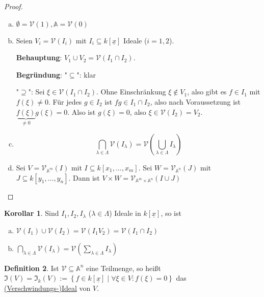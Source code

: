 \documentclass[
twoside=semi,
fontsize=12,
DIV=12, 
cleardoublepage=current,
leqno,
headings=optiontoheadandtoc, 
toc=idx
]{scrbook}
\newcommand{\A}{\mathbb{A}}
\newcommand{\V}{\mathcal{V}}
\newcommand{\x}{\underline{x}}
\newcommand{\I}{\mathfrak{I}}
\newcommand{\brac}[1]{\left( #1 \right)}
\newcommand{\set}[1]{\left\{ #1 \right\}}
\newcommand{\emphasize}[1]{\underline{#1}}
\theoremstyle{definition}
\newtheorem{definition}{Definition}[section]
\newtheorem{korollar}[definition]{Korollar}
\begin{document}
	\begin{proof}\hfill
		\begin{enumerate}[(a)]
			\item $\emptyset = \V(1), \A = \V(0)$
			
			\item Seien $V_i = \V(I_i)$ mit $I_i \subseteq k[\x]$ Ideale ($i = 1, 2$).
			\begin{tcolorbox}[colback=white,colframe=blue,arc=0cm]
				\textbf{Behauptung}: $V_1 \cup V_2 = \V(I_1 \cap I_2)$.
				
				\tcblower
				\textbf{Begr\"undung}: \newline
				"$\subseteq$": klar
				
				\medskip\noindent
				"$\supseteq$": Sei $\xi \in \V(I_1 \cap I_2)$. Ohne Einschr\"ankung $\xi \notin V_1$, also gibt es $f \in I_1$ mit $f(\xi) \neq 0$. F\"ur jedes $g \in I_2$ ist $fg \in I_1 \cap I_2$, also nach Voraussetzung ist $\underbrace{f(\xi)}_{\neq 0}g(\xi) = 0$. Also ist $g(\xi) = 0$, also $\xi \in \V(I_2) = V_2$.
			\end{tcolorbox}
			
			\item \[\bigcap_{\lambda \in \Lambda} \V(I_\lambda) = \V\brac{\bigcup_{\lambda \in \Lambda} I_\lambda}\]
			
			\item Sei $V = \V_{\A^m}(I)$ mit $I \subseteq k[x_1, \dots, x_m]$. Sei $W = \V_{\A^n}(J)$ mit $J \subseteq k[y_1, \dots, y_n]$. Dann ist
			$V\times W = \V_{\A^m\times \A^n}(I \cup J)$
		\end{enumerate}
	\end{proof}

	\begin{korollar}\label{1.2.5}\hfill\newline
		Sind $I_1, I_2, I_\lambda$ ($\lambda \in \Lambda$) Ideale in $k[\x]$, so ist
		\begin{enumerate}[(a)]
			\item $\V(I_1)\cup \V(I_2) = \V(I_1V_2) = \V(I_1 \cap I_2)$
			
			\item $\displaystyle \bigcap_{\lambda \in \Lambda} \V(I_\lambda) = \V\brac{\sum_{\lambda \in \Lambda} I_\lambda}$
		\end{enumerate}
	\end{korollar}

	\begin{definition}\label{1.2.6}\hfill\newline
		Ist $\V \subseteq \A^n$ eine Teilmenge, so hei\ss t $\I(V) = \I_k(V) := \set{f \in k[\x] \mid \forall \xi \in V: f(\xi) = 0}$ das \emphasize{(Verschwindungs-)Ideal} von $V$.
	\end{definition}
\end{document}

